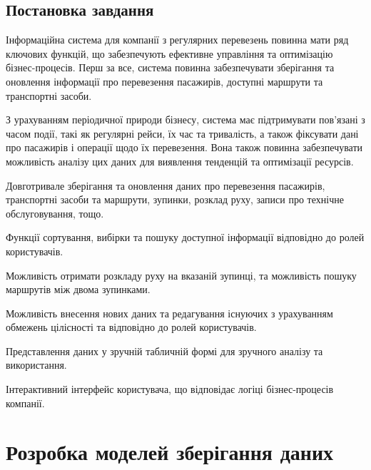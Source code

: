 \documentclass[oneside,14pt]{extarticle}
\begin{document}
\subsection{Постановка завдання}
Інформаційна система для компанії з регулярних перевезень повинна мати ряд ключових функцій, що забезпечують ефективне управління та оптимізацію бізнес-процесів. Перш за все, система повинна забезпечувати зберігання та оновлення інформації про перевезення пасажирів, доступні маршрути та транспортні засоби.

З урахуванням періодичної природи бізнесу, система має підтримувати пов’язані з часом події, такі як регулярні рейси, їх час та тривалість, а також фіксувати дані про пасажирів і операції щодо їх перевезення. Вона також повинна забезпечувати можливість аналізу цих даних для виявлення тенденцій та оптимізації ресурсів.

\begin{list}{•}{Інформаційна система для компанії з регулярних перевезень повинна мати наступні функції:}
    \item Довготривале зберігання та оновлення даних про перевезення пасажирів, транспортні засоби та маршрути, зупинки, розклад руху, записи про технічне обслуговування, тощо.
    \item Функції сортування, вибірки та пошуку доступної інформації відповідно до ролей користувачів.
    \item Можливість отримати розкладу руху на вказаній зупинці, та можливість пошуку маршрутів між двома зупинками.
    \item Можливість внесення нових даних та редагування існуючих з урахуванням обмежень цілісності та відповідно до ролей користувачів.
    \item Представлення даних у зручній табличній формі для зручного аналізу та використання.
    \item Інтерактивний інтерфейс користувача, що відповідає логіці бізнес-процесів компанії.
\end{list}
\newpage

\section{Розробка моделей зберігання даних}
\end{document}
